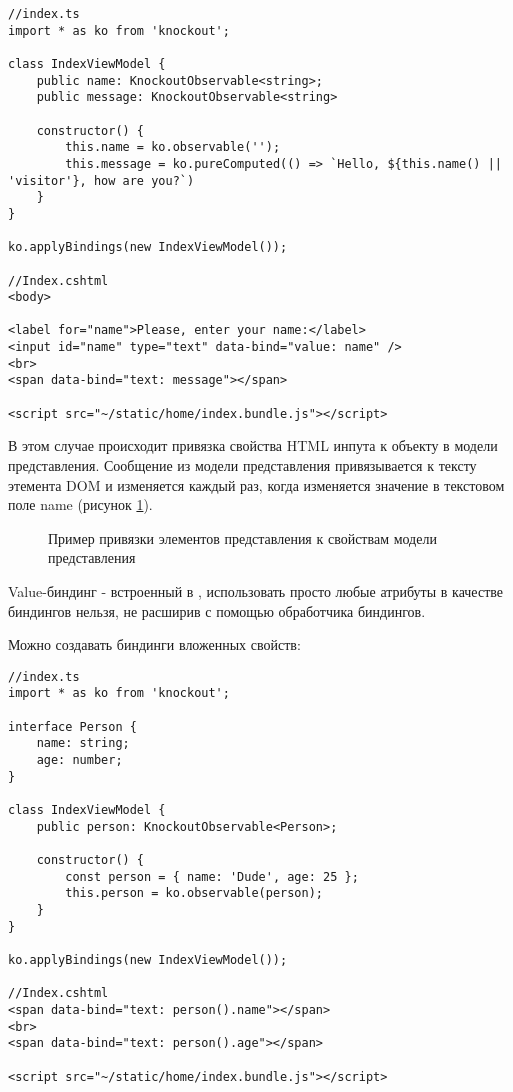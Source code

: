 \documentclass[a4paper,14pt]{extarticle}
\begin{document}
\begin{lstlisting}
//index.ts
import * as ko from 'knockout';

class IndexViewModel {
    public name: KnockoutObservable<string>;
    public message: KnockoutObservable<string>

    constructor() {
        this.name = ko.observable('');
        this.message = ko.pureComputed(() => `Hello, ${this.name() || 'visitor'}, how are you?`)
    }
}

ko.applyBindings(new IndexViewModel());

//Index.cshtml
<body>

<label for="name">Please, enter your name:</label>
<input id="name" type="text" data-bind="value: name" />
<br>
<span data-bind="text: message"></span>

<script src="~/static/home/index.bundle.js"></script>
\end{lstlisting}

В этом случае происходит привязка свойства  HTML инпута к объекту в
модели представления. Сообщение  из модели представления
привязывается к тексту этемента DOM и изменяется каждый раз, когда изменяется
значение в текстовом поле name (рисунок \ref{fig:binding12}).

\begin{figure}[H]
    \centering
    \hspace{.15\linewidth}
    \caption{Пример привязки элементов представления к свойствам модели представления}
    \label{fig:binding12}
\end{figure}

Value-биндинг - встроенный в , использовать просто любые атрибуты в качестве биндингов
нельзя, не расширив  с помощью обработчика биндингов.

Можно создавать биндинги вложенных свойств:

\begin{lstlisting}
//index.ts
import * as ko from 'knockout';

interface Person {
    name: string;
    age: number;
}

class IndexViewModel {
    public person: KnockoutObservable<Person>;

    constructor() {
        const person = { name: 'Dude', age: 25 };
        this.person = ko.observable(person);
    }
}

ko.applyBindings(new IndexViewModel());

//Index.cshtml
<span data-bind="text: person().name"></span>
<br>
<span data-bind="text: person().age"></span>

<script src="~/static/home/index.bundle.js"></script>
\end{lstlisting}
\end{document}
